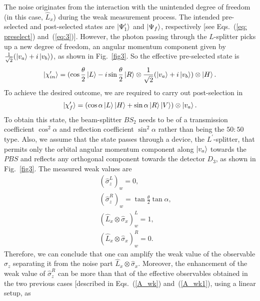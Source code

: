 \documentclass[aps,pra,showpacs,twoside,twocolumn,10pt]{revtex4-1}
\begin{document}
  The noise originates from the interaction with the unintended degree of freedom (in this case, $\hat{L}_x$) during the weak measurement process. 
  The intended pre-selected and post-selected states are $\ket{\Psi_1^\prime}$ and $\ket{\Psi_f}$, respectively [see Eqs.~(\ref{eq: preselect}) and~(\ref{eq:3})]. However, the photon passing through the $L$-splitter picks up a new degree of freedom, an angular momentum component given by $\frac{1}{\sqrt{2}}(\ket{v_a}+i\ket{v_b})$, as shown in Fig.~\ref{fig3}. So the effective pre-selected state is
    \begin{equation}
       \ket{\chi_{in}^{\prime}}=(\cos\frac{\theta}{2}\ket{L}- 
       i\sin\frac{\theta}{2}\ket{R}\otimes\frac{1}{\sqrt{2}}(\ket{v_a}+i\ket{v_b})\otimes \ket{H}.
       \label{eq:pree}
    \end{equation} 
To achieve the desired outcome, we are required to carry out post-selection in     
\begin{equation}
\ket{\chi_f^{\prime}}=(\cos\alpha\ket{L}\ket{H}+ \sin\alpha\ket{R}\ket{V})\otimes\ket{v_a}.
\label{eq:post}
\end{equation}
To obtain this state, the beam-splitter $BS_2$ needs to be of a transmission coefficient $\cos^2 \alpha$ and reflection coefficient $\sin^2 \alpha$ rather than being the $50:50$ type. Also, we assume that the state passes through a device, the $L^\prime$-splitter, that permits only the orbital angular momentum component along $\ket{v_a}$ towards the $PBS$ and reflects any orthogonal component towards the detector $D_3$, as shown in Fig.~\ref{fig3}.        
        The measured weak values are
        \begin{eqnarray}
        &&(\hat{\sigma}_z^L)_w = 0,\nonumber \\
        &&(\hat{\sigma}_z^R)_w = \tan\frac{\theta}{2}\tan\alpha, \nonumber \\
        &&(\hat{L}_x\otimes\hat{\sigma}_x)^L_w = 1, \nonumber \\
        &&(\hat{L}_x\otimes\hat{\sigma}_x)^R_w = 0. 
        \label{wk_final}
        \end{eqnarray}
Therefore, we can conclude that one can amplify the weak value of the observable $\hat{\sigma}_z$ separating it from the noise part $\hat{L}_x \otimes \hat{\sigma}_x$. Moreover, the enhancement of the weak value of $\hat{\sigma}_z^R$ can be more than that of the effective observables obtained in the two previous cases [described in Eqs.~(\ref{A_wk}) and~(\ref{A_wk1}), using a linear setup, as 
\end{document}
